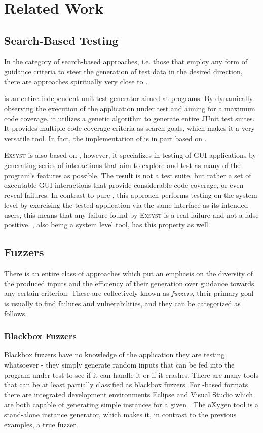 \section{Related Work}
\label{sec:relwork}
\subsection{Search-Based Testing}
In the category of search-based approaches, i.e. those that employ any form of guidance criteria to steer the
generation of test data in the desired direction, there are approaches spiritually very close to \xmlmate.

\evosuite{}\cite{fraser2013whole} is an entire independent unit test generator aimed at \java programs. By
dynamically observing the execution of the application under test and aiming for a maximum code coverage, it
utilizes a genetic algorithm to generate entire JUnit test suites. It provides multiple code coverage
criteria as search goals, which makes it a very versatile tool. In fact, the implementation of \xmlmate is
in part based on \evosuite.

\textsc{Exsyst}\cite{gross-issta2012} is also based on \evosuite, however, it specializes in testing of \java
GUI applications by generating series of interactions that aim to explore and test as many of the program's
features as possible. The result is not a test suite, but rather a set of executable GUI interactions that
provide considerable code coverage, or even reveal failures. In contrast to pure \evosuite, this approach
performs testing on the system level by exercising the tested application via the same interface as its
intended users, this means that any failure found by \textsc{Exsyst} is a real failure and not a false
positive. \xmlmate, also being a system level tool, has this property as well.

\subsection{Fuzzers}
There is an entire class of approaches which put an emphasis on the diversity of the produced inputs and the
efficiency of their generation over guidance towards any certain criterion. These are collectively known as
\emph{fuzzers}, their primary goal is usually to find failures and vulnerabilities, and they can be categorized
as follows.
\tocless\subsubsection{Blackbox Fuzzers}
Blackbox fuzzers have no knowledge of the application they are testing whatsoever - they simply generate random
inputs that can be fed into the program under test to see if it can handle it or if it crashes.
There are many tools that can be at least partially classified as blackbox fuzzers. For \xml-based formats
there are integrated development environments Eclipse\cite{eclipse} and Visual Studio\cite{visual} which are
both capable of generating simple instances for a given \xsd. The oXygen\cite{oxygen} tool is a stand-alone
\xml instance generator, which makes it, in contrast to the previous examples, a true fuzzer.
 		 
